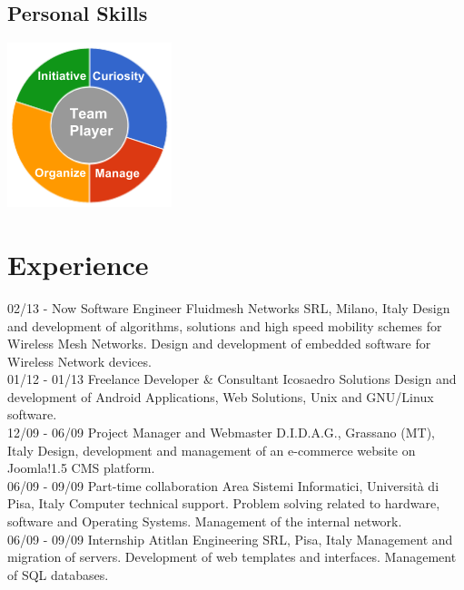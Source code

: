 \documentclass[]{friggeri-cv}
\begin{document}
\begin{aside}
  \section{Personal Skills}
    \includegraphics[scale=0.62]{img/personal.png}
    ~
\end{aside}

\section{Experience}
\begin{entrylist}
  \entry
    {02/13 - Now}
    {Software Engineer}
    {Fluidmesh Networks SRL, Milano, Italy}
    {Design and development of algorithms, solutions and high speed mobility           schemes for Wireless Mesh Networks. Design and development of embedded software     for Wireless Network devices.\\}
  \entry
    {01/12 - 01/13}
    {Freelance Developer \& Consultant}
    {Icosaedro Solutions}
    {Design and development of Android Applications, Web Solutions, Unix and GNU/Linux software.\\}
    \entry
    {12/09 - 06/09}
    {Project Manager and Webmaster}
    {D.I.D.A.G., Grassano (MT), Italy}
    {Design, development and management of an e-commerce website on Joomla!1.5 CMS platform.\\}
    \entry
    {06/09 - 09/09}
    {Part-time collaboration}
    {Area Sistemi Informatici, Università di Pisa, Italy}
    {Computer technical support. Problem solving related to hardware, software and Operating Systems. Management of the internal network.\\}
    \entry
    {06/09 - 09/09}
    {Internship}
    {Atitlan Engineering SRL, Pisa, Italy}
    {Management and migration of servers. Development of web templates and interfaces. Management of SQL databases.}
\end{entrylist}
\end{document}

